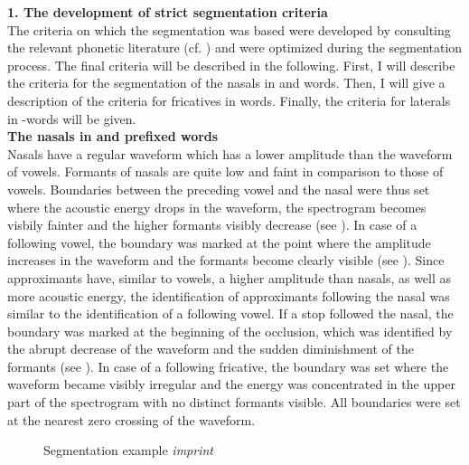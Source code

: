 \textbf{1. The development of strict segmentation criteria}\\

The criteria on which the segmentation was based were developed by consulting  the relevant phonetic literature (cf. \citealt{Ladefoged.1996,Johnson.1997b,Ladefoged.2003,Machac.2009,Ladefoged.2011}) and were optimized during the segmentation process. The final criteria will be described in the following. First, I will describe the criteria for the segmentation of the nasals in  and  words. Then, I will give a description of the criteria for fricatives in words. Finally, the criteria for laterals in -words will be given.\\



\textbf{The nasals in  and prefixed words}\\

Nasals have a regular waveform which has a lower amplitude than the waveform of vowels. Formants of nasals are quite low and faint in comparison to those of vowels. Boundaries between the preceding vowel and the nasal were thus set where the acoustic energy drops in the waveform, the spectrogram becomes visbily fainter and the higher formants visibly decrease (see ). In case of a following vowel, the boundary was marked at the point where the amplitude increases in the waveform and the formants become clearly visible (see ).  Since approximants have, similar to vowels,  a higher amplitude than nasals, as well as more acoustic energy, the identification of approximants following the nasal was similar to the identification of a following vowel. If a stop followed the nasal, the boundary was marked at the beginning of the occlusion, which was identified by the abrupt decrease of the waveform and the sudden diminishment of the formants (see ). In case of a following fricative, the boundary was set where the waveform became visibly irregular and the energy was concentrated in the upper part of the spectrogram with no distinct formants visible. All boundaries were set at the nearest zero crossing of the waveform.\\



\begin{figure} 
	\caption{Segmentation example \textit{imprint}}
	\label{fig:segmentation imprint} 
\end{figure}


